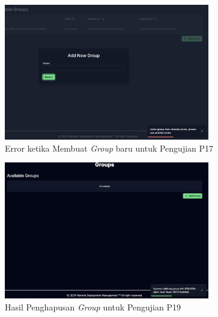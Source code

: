 \begin{figure}[ht]
  \centering
  \includegraphics[width=0.8\textwidth]{resources/chapter-4/pengujian/p17.jpg}
  \caption{Error ketika Membuat \textit{Group} baru untuk Pengujian P17}
  \label{fig:pengujian-p17}
\end{figure}

\begin{figure}[ht]
  \centering
  \includegraphics[width=0.8\textwidth]{resources/chapter-4/pengujian/p19.jpg}
  \caption{Hasil Penghapusan \textit{Group} untuk Pengujian P19}
  \label{fig:pengujian-p19}
\end{figure}

